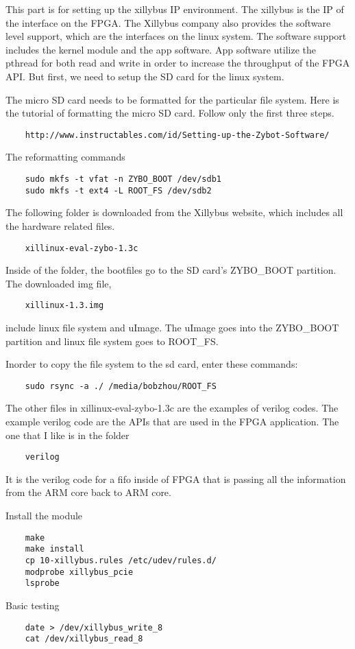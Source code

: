 This part is for setting up the xillybus IP environment. The xillybus is the IP of the interface on
the FPGA. The Xillybus company also provides the software level support, which are the interfaces on
the linux system. The software support includes the kernel module and the app software. App software
utilize the pthread for both read and write in order to increase the throughput of the FPGA API. But
first, we need to setup the SD card for the linux system.

The micro SD card needs to be formatted for the particular file system. Here is the tutorial of
formatting the micro SD card. Follow only the first three steps.

\begin{lstlisting}
    http://www.instructables.com/id/Setting-up-the-Zybot-Software/
\end{lstlisting}

The reformatting commands
\begin{lstlisting}
    sudo mkfs -t vfat -n ZYBO_BOOT /dev/sdb1
    sudo mkfs -t ext4 -L ROOT_FS /dev/sdb2
\end{lstlisting}


The following folder is downloaded from the Xillybus website, which includes all the hardware
related files.
\begin{lstlisting}
    xillinux-eval-zybo-1.3c
\end{lstlisting}

Inside of the folder, the bootfiles go to the SD card's ZYBO\_BOOT partition. The downloaded img file, 
\begin{lstlisting}
    xillinux-1.3.img
\end{lstlisting}
include linux file system and uImage. The uImage goes into the  ZYBO\_BOOT partition and linux file
system goes to ROOT\_FS.

Inorder to copy the file system to the sd card, enter these commands:
\begin{lstlisting}
    sudo rsync -a ./ /media/bobzhou/ROOT_FS
\end{lstlisting}

The other files in xillinux-eval-zybo-1.3c are the examples of verilog codes. The example verilog
code are the APIs that are used in the FPGA application. The one that I like is in the folder
\begin{lstlisting}
    verilog
\end{lstlisting}
It is the verilog code for a fifo inside of FPGA that is passing all the information from the ARM
core back to ARM core.

Install the module 
\begin{lstlisting}
    make
    make install
    cp 10-xillybus.rules /etc/udev/rules.d/
    modprobe xillybus_pcie
    lsprobe
\end{lstlisting}

Basic testing 
\begin{lstlisting}
    date > /dev/xillybus_write_8
    cat /dev/xillybus_read_8
\end{lstlisting}


